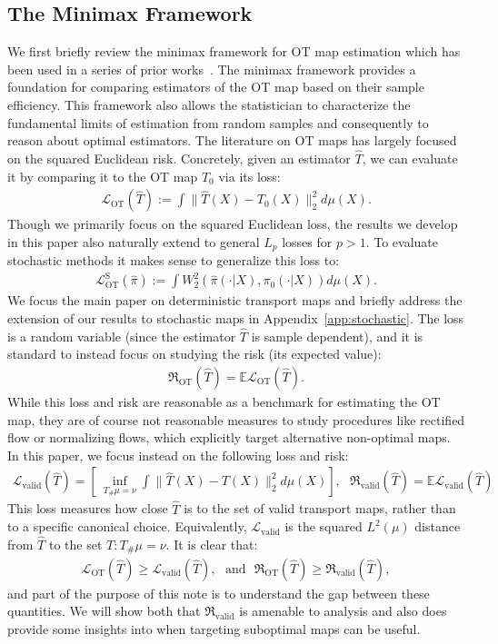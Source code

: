 \documentclass[11pt,twoside]{article}
\newcommand{\rot}{\mathfrak{R}_{\text{OT}}}
\newcommand{\rvalid}{\mathfrak{R}_{\text{valid}}}
\newcommand{\lot}{\mathcal{L}_{\text{OT}}}
\newcommand{\lots}{\mathcal{L}^\text{S}_{\text{OT}}}
\newcommand{\lvalid}{\mathcal{L}_{\text{valid}}}
\begin{document}
\subsection{The Minimax Framework}
We first briefly review the minimax framework for OT map estimation which has been used in a series of prior works~\cite{manole2024plugin,deb2021,hutter2021,balakrishnan2025statistical,balakrishnan2026stability}.
The minimax framework provides a 
foundation for comparing estimators of the OT map based on their sample efficiency. This
framework also allows the statistician to characterize the fundamental limits of estimation
from random samples and consequently to reason about optimal estimators. 
The literature on OT maps has largely focused on the squared Euclidean risk. Concretely, given an 
estimator $\widehat{T}$, we can evaluate it by comparing it to the OT map $T_0$ via its loss:
\begin{align*}
\lot(\widehat{T}) := \int \|\widehat{T}(X) - T_0(X)\|_2^2 d\mu(X).
\end{align*}
Though we primarily focus on the squared Euclidean loss, the results we develop in this paper also naturally extend to general $L_p$ losses for $p > 1$. 
To evaluate stochastic methods it makes sense to generalize this loss to:
\begin{align*}
\lots(\widehat{\pi}) := \int W_2^2(\widehat{\pi}(\cdot | X), \pi_0( \cdot | X)) d\mu(X).
\end{align*}
We focus the main paper on deterministic transport maps and briefly address the extension of our results to stochastic maps in Appendix~\ref{app:stochastic}.
The loss is a random variable (since the estimator $\widehat{T}$ is sample dependent), and it is standard to instead focus on studying the risk
(its expected value):
\begin{align*}
\rot(\widehat{T}) = \mathbb{E} \lot(\widehat{T}). 
\end{align*}
While this loss and risk are reasonable as a benchmark for estimating the OT map, they are of course not reasonable measures to study procedures like rectified flow or normalizing flows, which explicitly target alternative non-optimal maps.
In this paper, we focus instead on the following loss and risk:
\begin{align*}
\lvalid(\widehat{T}) = \left[\ \inf_{T_{\#} \mu = \nu} \int \|\widehat{T}(X) - T(X)\|_2^2 d\mu(X)\right],~~~\rvalid(\widehat{T}) = \mathbb{E} \lvalid(\widehat{T})
\end{align*}
This loss measures how close $\widehat{T}$ is to the set of valid transport maps, rather than to a specific canonical choice.
Equivalently, $\lvalid$ is the squared $L^2(\mu)$ distance from $\widehat T$ to the set ${T : T_{\#}\mu = \nu}$.
It is clear that:
\begin{align*}
\lot(\widehat{T}) \geq \lvalid(\widehat{T}),~~~\text{and}~~~
\rot(\widehat{T}) \geq \rvalid(\widehat{T}),
\end{align*}
and part of the purpose of this note is to understand the gap between these quantities. We will show both
that $\rvalid$ is amenable to analysis and also does provide some insights into when targeting suboptimal maps can be useful.
\end{document}
